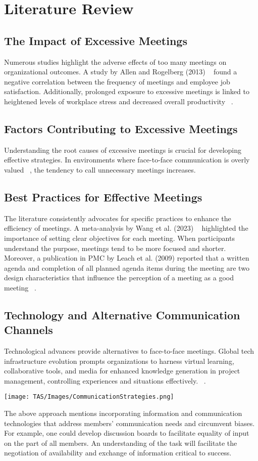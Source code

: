 \section{Literature Review}
\subsection{The Impact of Excessive Meetings}
Numerous studies highlight the adverse effects of too many meetings on organizational outcomes. A study by Allen and Rogelberg (2013) ~\cite{09} found a negative correlation between the frequency of meetings and employee job satisfaction. Additionally, prolonged exposure to excessive meetings is linked to heightened levels of workplace stress and decreased overall productivity  ~\cite{10}.
\subsection{Factors Contributing to Excessive Meetings}
Understanding the root causes of excessive meetings is crucial for developing effective strategies. In environments where face-to-face communication is overly valued ~\cite{11}, the tendency to call unnecessary meetings increases.
\subsection{Best Practices for Effective Meetings}
The literature consistently advocates for specific practices to enhance the efficiency of meetings. A meta-analysis by Wang et al. (2023) ~\cite{12} highlighted the importance of setting clear objectives for each meeting. When participants understand the purpose, meetings tend to be more focused and shorter. Moreover, a publication in PMC by Leach et al. (2009) reported that a written agenda and completion of all planned agenda items during the meeting are two design characteristics that influence the perception of a meeting as a good meeting ~\cite{13}.

\subsection{Technology and Alternative Communication Channels}
Technological advances provide alternatives to face-to-face meetings. Global tech infrastructure evolution prompts organizations to harness virtual learning, collaborative tools, and media for enhanced knowledge generation in project management, controlling experiences and situations effectively. ~\cite{14}.
\begin{center}
\texttt{[image: TAS/Images/CommunicationStrategies.png]}\\
\end{center}
The above approach mentions incorporating information and communication technologies that address members’ communication needs and circumvent biases. For example, one could develop discussion boards to
facilitate equality of input on the part of all members. An understanding of the task will facilitate the negotiation of availability and exchange of information critical to success. 

